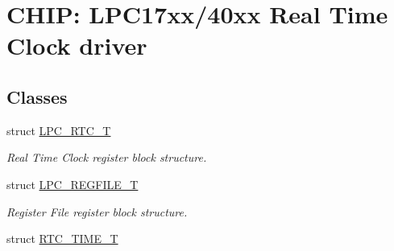\hypertarget{group___r_t_c__17_x_x__40_x_x}{\section{C\+H\+I\+P\+: L\+P\+C17xx/40xx Real Time Clock driver}
\label{group___r_t_c__17_x_x__40_x_x}
}
\subsection*{Classes}
\begin{DoxyCompactItemize}
\item 
struct \hyperlink{struct_l_p_c___r_t_c___t}{L\+P\+C\+\_\+\+R\+T\+C\+\_\+\+T}
\begin{DoxyCompactList}\small\item\em Real Time Clock register block structure. \end{DoxyCompactList}\item 
struct \hyperlink{struct_l_p_c___r_e_g_f_i_l_e___t}{L\+P\+C\+\_\+\+R\+E\+G\+F\+I\+L\+E\+\_\+\+T}
\begin{DoxyCompactList}\small\item\em Register File register block structure. \end{DoxyCompactList}\item 
struct \hyperlink{struct_r_t_c___t_i_m_e___t}{R\+T\+C\+\_\+\+T\+I\+M\+E\+\_\+\+T}
\end{DoxyCompactItemize}
